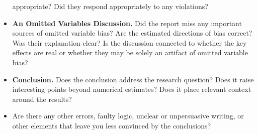 \documentclass[
]{article}
\begin{document}
\begin{itemize}
  appropriate? Did they respond appropriately to any violations?
\item
  \textbf{An Omitted Variables Discussion.} Did the report miss any
  important sources of omitted variable bias? Are the estimated
  directions of bias correct? Was their explanation clear? Is the
  discussion connected to whether the key effects are real or whether
  they may be solely an artifact of omitted variable bias?
\item
  \textbf{Conclusion.} Does the conclusion address the research
  question? Does it raise interesting points beyond numerical estimates?
  Does it place relevant context around the results?
\item
  Are there any other errors, faulty logic, unclear or unpersuasive
  writing, or other elements that leave you less convinced by the
  conclusions?
\end{itemize}
\end{document}
